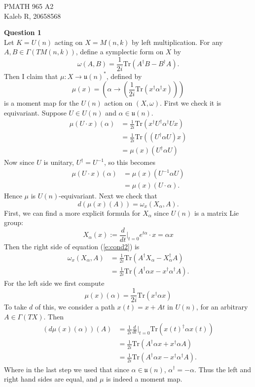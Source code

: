 \documentclass{article}
\newcommand{\Tr}{\mathrm{Tr}}
\begin{document}
\noindent PMATH 965 A2\\
Kaleb R, 20658568 \vspace{1em}

\noindent \textbf{Question 1} \\
Let $K = U(n)$ acting on $X=M(n,k)$ by left multiplication. For any $A,B \in \Gamma(TM(n,k))$, define a symplectic form on $X$ by
$$\omega(A,B) = \frac{1}{2i}\Tr(A^\dagger B - B^\dagger A).$$
Then I claim that $\mu:X\to \mathfrak{u}(n)^\ast$, defined by
$$\mu(x) = \left(\alpha \to \left(\frac{1}{2i}\Tr\left(x^\dagger \alpha^\dagger x\right)\right)\right)$$
is a moment map for the $U(n)$ action on $(X,\omega)$. First we check it is equivariant. Suppose $U\in U(n)$ and $\alpha \in \mathfrak{u}(n)$.
\begin{align*}
	\mu(U\cdot x)(\alpha) &= \frac{1}{2i}\Tr(x^\dagger U^\dagger \alpha^\dagger Ux)\\
	&= \frac{1}{2i}\Tr\left((U^\dagger \alpha U) x\right)\\
	&= \mu(x)(U^\dagger\alpha U)
\end{align*}
Now since $U$ is unitary, $U^\dagger = U^{-1}$, so this becomes
\begin{align*}
	\mu(U\cdot x)(\alpha)&= \mu(x)(U^{-1}\alpha U)\\
	&= \mu(x)(U\cdot \alpha).
\end{align*}
Hence $\mu$ is $U(n)$-equivariant. Next we check that 
\begin{equation}
	\label{e:cond2}
	d\left(\mu(x)(A)\right) = \omega_x(X_\alpha, A).
\end{equation}
First, we can find a more explicit formula for $X_\alpha$ since $U(n)$ is a matrix Lie group:
$$X_\alpha(x) := \frac{d}{dt}|_{t=0} e^{t\alpha}\cdot x = \alpha x$$
Then the right side of equation (\ref{e:cond2}) is
\begin{align*}
	\omega_x(X_\alpha, A) &= \frac{1}{2i}\Tr(A^\dagger X_\alpha - X_\alpha^\dagger A)\\
	&= \frac{1}{2i}\Tr(A^\dagger \alpha x - x^\dagger \alpha^\dagger A).
\end{align*}
For the left side we first compute
$$\mu(x)(\alpha) = \frac{1}{2i}\Tr(x^\dagger \alpha x)$$
To take $d$ of this, we consider a path $x(t)=x+At$ in $U(n)$, for an arbitrary $A\in\Gamma(TX)$. Then 
\begin{align*}
	(d\mu(x)(\alpha))(A) &= \frac{1}{2i}\frac{d}{dt}|_{t=0} \Tr(x(t)^\dagger \alpha x(t))\\
	&= \frac{1}{2i}\Tr(A^\dagger \alpha x + x^\dagger \alpha A)\\
	&= \frac{1}{2i}\Tr(A^\dagger \alpha x - x^\dagger \alpha^\dagger A).
\end{align*}
Where in the last step we used that since $\alpha \in \mathfrak{u}(n)$, $\alpha^\dagger = -\alpha$. Thus the left and right hand sides are equal, and $\mu$ is indeed a moment map. \vspace{1em}
\end{document}
